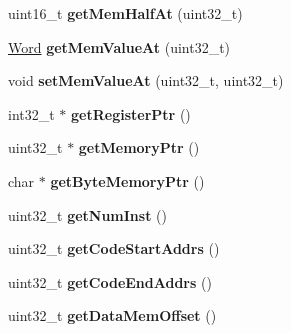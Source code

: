 \begin{DoxyCompactItemize}
\item 
uint16\+\_\+t {\bfseries get\+Mem\+Half\+At} (uint32\+\_\+t)\hypertarget{classdbt_1_1_machine_a8553bd6c225157a6055c810703b6a548}{}\label{classdbt_1_1_machine_a8553bd6c225157a6055c810703b6a548}

\item 
\hyperlink{uniondbt_1_1_word}{Word} {\bfseries get\+Mem\+Value\+At} (uint32\+\_\+t)\hypertarget{classdbt_1_1_machine_ad7dcc19c447ea49f6e15ceb299339965}{}\label{classdbt_1_1_machine_ad7dcc19c447ea49f6e15ceb299339965}

\item 
void {\bfseries set\+Mem\+Value\+At} (uint32\+\_\+t, uint32\+\_\+t)\hypertarget{classdbt_1_1_machine_a34f6a4e537e673efdba6a311f88dfe0e}{}\label{classdbt_1_1_machine_a34f6a4e537e673efdba6a311f88dfe0e}

\item 
int32\+\_\+t $\ast$ {\bfseries get\+Register\+Ptr} ()\hypertarget{classdbt_1_1_machine_a046276e6a8e40c98d4536dbdd5a775b7}{}\label{classdbt_1_1_machine_a046276e6a8e40c98d4536dbdd5a775b7}

\item 
uint32\+\_\+t $\ast$ {\bfseries get\+Memory\+Ptr} ()\hypertarget{classdbt_1_1_machine_ab739dc3bf5faaec55db61b55f39035d5}{}\label{classdbt_1_1_machine_ab739dc3bf5faaec55db61b55f39035d5}

\item 
char $\ast$ {\bfseries get\+Byte\+Memory\+Ptr} ()\hypertarget{classdbt_1_1_machine_a92c7a59994c7a4b73bf87cd08e2fb12f}{}\label{classdbt_1_1_machine_a92c7a59994c7a4b73bf87cd08e2fb12f}

\item 
uint32\+\_\+t {\bfseries get\+Num\+Inst} ()\hypertarget{classdbt_1_1_machine_adfab9d2ce15782890aec405a51761380}{}\label{classdbt_1_1_machine_adfab9d2ce15782890aec405a51761380}

\item 
uint32\+\_\+t {\bfseries get\+Code\+Start\+Addrs} ()\hypertarget{classdbt_1_1_machine_af65d826f3c83548b80a7d434206ee2c9}{}\label{classdbt_1_1_machine_af65d826f3c83548b80a7d434206ee2c9}

\item 
uint32\+\_\+t {\bfseries get\+Code\+End\+Addrs} ()\hypertarget{classdbt_1_1_machine_a54e12561684732035c5e34de9817322c}{}\label{classdbt_1_1_machine_a54e12561684732035c5e34de9817322c}

\item 
uint32\+\_\+t {\bfseries get\+Data\+Mem\+Offset} ()\hypertarget{classdbt_1_1_machine_a671559f1760d6957c6a60dd7bc3dee31}{}\label{classdbt_1_1_machine_a671559f1760d6957c6a60dd7bc3dee31}


\end{DoxyCompactItemize}
